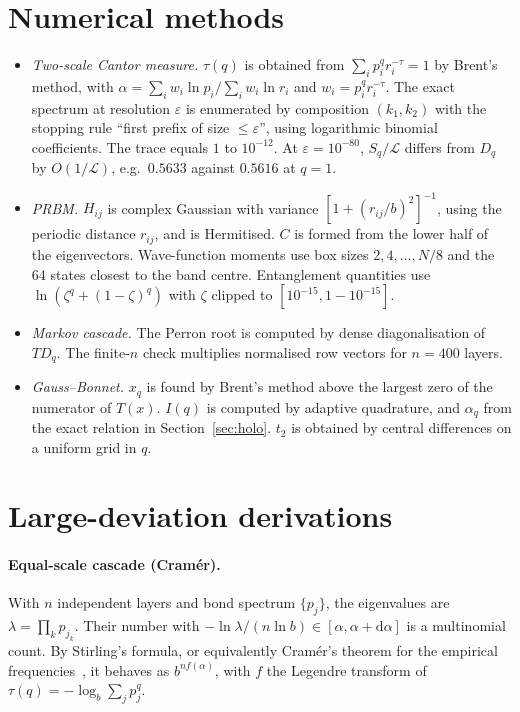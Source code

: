 \documentclass[11pt]{article}
\theoremstyle{definition}\newtheorem{definition}{Definition}[section]
\theoremstyle{remark}\newtheorem*{remark}{Remark}
\newcommand{\dd}{\mathrm{d}}
\newcommand{\cL}{\mathcal{L}}
\begin{document}
\appendix
\section{Numerical methods}
\label{app:numerics}
\begin{itemize}
\item \emph{Two-scale Cantor measure.} $\tau(q)$ is obtained from $\sum_ip_i^qr_i^{-\tau}=1$ by Brent's method, with
$\alpha=\sum_iw_i\ln p_i/\sum_iw_i\ln r_i$ and $w_i=p_i^qr_i^{-\tau}$. The exact spectrum at resolution $\varepsilon$ is
enumerated by composition $(k_1,k_2)$ with the stopping rule ``first prefix of size $\le\varepsilon$'', using logarithmic
binomial coefficients. The trace equals $1$ to $10^{-12}$. At $\varepsilon=10^{-80}$, $S_q/\cL$ differs from $D_q$ by
$O(1/\cL)$, e.g.\ $0.5633$ against $0.5616$ at $q=1$.
\item \emph{PRBM.} $H_{ij}$ is complex Gaussian with variance $[1+(r_{ij}/b)^2]^{-1}$, using the periodic distance
$r_{ij}$, and is Hermitised. $C$ is formed from the lower half of the eigenvectors. Wave-function moments use
box sizes $2,4,\dots,N/8$ and the 64 states closest to the band centre. Entanglement quantities use
$\ln(\zeta^q+(1-\zeta)^q)$ with $\zeta$ clipped to $[10^{-15},1-10^{-15}]$.
\item \emph{Markov cascade.} The Perron root is computed by dense diagonalisation of $TD_q$. The finite-$n$
check multiplies normalised row vectors for $n=400$ layers.
\item \emph{Gauss--Bonnet.} $x_q$ is found by Brent's method above the largest zero of the numerator of $T(x)$.
$I(q)$ is computed by adaptive quadrature, and $\alpha_q$ from the exact relation in Section~\ref{sec:holo}. $t_2$ is
obtained by central differences on a uniform grid in $q$.
\end{itemize}

\section{Large-deviation derivations}
\label{app:ld}
\paragraph{Equal-scale cascade (Cram\'er).} With $n$ independent layers and bond spectrum $\{p_j\}$, the
eigenvalues are $\lambda=\prod_kp_{j_k}$. Their number with $-\ln\lambda/(n\ln b)\in[\alpha,\alpha+\dd\alpha]$ is a multinomial
count. By Stirling's formula, or equivalently Cram\'er's theorem for the empirical frequencies~\cite{DemboZeitouni},
it behaves as $b^{nf(\alpha)}$, with $f$ the Legendre transform of $\tau(q)=-\log_b\sum_jp_j^q$.
\end{document}
